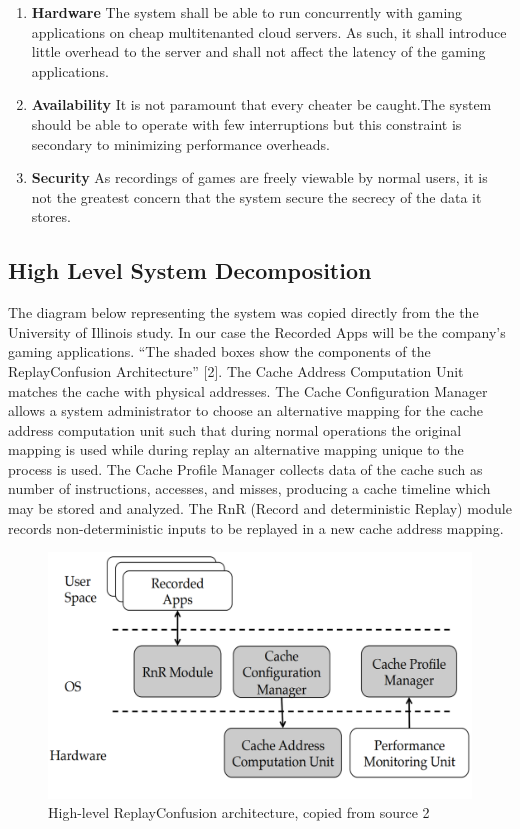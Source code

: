 \documentclass[12pt]{article}
\begin{document}
\begin{enumerate}
    \item \textbf{Hardware} The system shall be able to run concurrently with gaming applications on cheap
    multitenanted cloud servers. As such, it shall introduce little overhead to the server and shall not affect
    the latency of the gaming applications.
    \item \textbf{Availability} It is not paramount that every cheater be caught.The system should be able to
    operate with few interruptions but this constraint is secondary to minimizing performance overheads.
    \item \textbf{Security} As recordings of games are freely viewable by normal users, it is not the greatest
    concern that the system secure the secrecy of the data it stores.
\end{enumerate}

\subsection{High Level System Decomposition}

The diagram below representing the system was copied directly from the the University of Illinois study. In
our case the Recorded Apps will be the company’s gaming applications. “The shaded boxes show the components
of the ReplayConfusion Architecture” [2]. The Cache Address Computation Unit matches the cache with physical
addresses. The Cache Configuration Manager allows a system administrator to choose an alternative mapping for
the cache address computation unit such that during normal operations the original mapping is used while during
replay an alternative mapping unique to the process is used. The Cache Profile Manager collects data of the
cache such as number of instructions, accesses, and misses, producing a cache timeline which may be stored
and analyzed. The RnR (Record and deterministic Replay) module records non-deterministic inputs to be replayed
in a new cache address mapping.

\begin{figure}
  \includegraphics[width=\linewidth]{architecture.png}
  \caption{High-level ReplayConfusion architecture, copied from source 2}
  \label{fig:boat1}
\end{figure}
\end{document}
